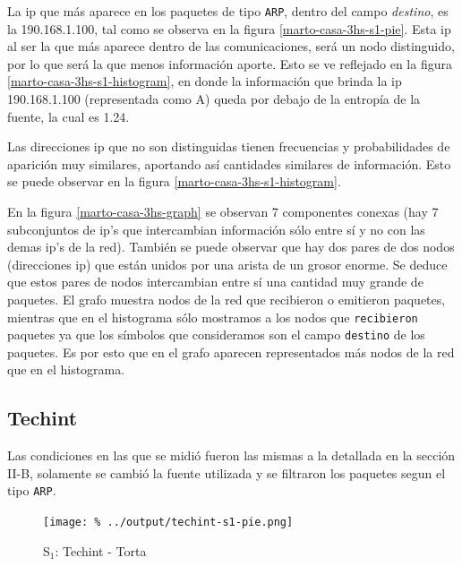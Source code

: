 \documentclass[final,inline,a4paper,narroweqnarray]{ieee}
\begin{document}
  La ip que más aparece en los paquetes de tipo \texttt{ARP}, dentro
  del campo \textit{destino}, es la 190.168.1.100, tal como se observa
  en la figura \ref{marto-casa-3hs-s1-pie}. Esta ip al ser la que más
  aparece dentro de las comunicaciones, será un nodo distinguido, por
  lo que será la que menos información aporte. Esto se ve reflejado en
  la figura \ref{marto-casa-3hs-s1-histogram}, en donde la información
  que brinda la ip 190.168.1.100 (representada como A) queda por
  debajo de la entropía de la fuente, la cual es 1.24.

  Las direcciones ip que no son distinguidas tienen frecuencias y
  probabilidades de aparición muy similares, aportando así cantidades
  similares de información. Esto se puede observar en la figura
  \ref{marto-casa-3hs-s1-histogram}.

  En la figura \ref{marto-casa-3hs-graph} se observan 7 componentes
  conexas (hay 7 subconjuntos de ip's que intercambian información
  sólo entre sí y no con las demas ip's de la red). También se puede
  observar que hay dos pares de dos nodos (direcciones ip) que están
  unidos por una arista de un grosor enorme. Se deduce que estos pares
  de  nodos intercambian entre sí una cantidad muy grande de paquetes.
  El grafo muestra nodos de la red que recibieron o emitieron
  paquetes, mientras que en el histograma sólo mostramos a los nodos
  que \texttt{recibieron} paquetes ya que los símbolos que
  consideramos son el campo \texttt{destino} de los paquetes. Es por
  esto que en el grafo aparecen representados más nodos de la red que
  en el histograma.

  \subsection{Techint}

  Las condiciones en las que se midió fueron las mismas a la detallada
  en la sección II-B, solamente se cambió la fuente utilizada y se
  filtraron los paquetes segun el tipo \texttt{ARP}.

    \begin{figure}[H]\begin{center}
      \texttt{[image: \%
      ../output/techint-s1-pie.png]}
      \vspace{-2em}
      \caption{S$_1$: Techint - Torta}
      \label{techint-s1-pie}
    \end{center}\end{figure}
\end{document}
